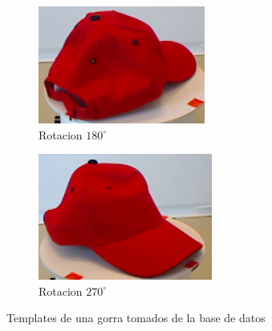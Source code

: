 \begin{figure}
	\begin{subfigure}[b]{0.25\textwidth}
		\includegraphics[width=\textwidth]{img/180_crop.png}
		\caption{Rotacion $180^{\circ}$}
	\end{subfigure}
	\quad
	\begin{subfigure}[b]{0.25\textwidth}
		\includegraphics[width=\textwidth]{img/270_crop.png}
		\caption{Rotacion $270^{\circ}$}
	\end{subfigure}
	\caption{Templates de una gorra tomados de la base de datos}
	\label{templates_objeto}
\end{figure}

